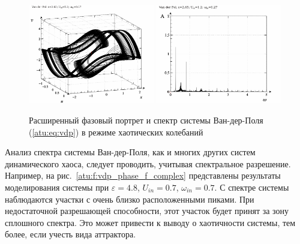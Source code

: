 \begin{figure}[ht!]
\begin{center}
  \includegraphics[width=0.49\textwidth]{p/cha/vdp/vdp_0-p_ph2d_2x65_1x20_0x27.png}
  \hfill
  \includegraphics[width=0.49\textwidth]{p/cha/vdp/vdp_fft-p_f_2x65_1x20_0x27.png}
\end{center}
  \caption{Расширенный фазовый портрет и спектр системы Ван-дер-Поля (\ref{atu:eq:vdp}) в режиме хаотических колебаний}
\label{atu:f:vdp_phase_f_chaos}
\end{figure}

Анализ спектра системы Ван-дер-Поля, как и многих других систем
динамического хаоса, следует проводить, учитывая
спектральное разрешение.
Например, на  рис.~\ref{atu:f:vdp_phase_f_complex}
представлены результаты моделирования системы при
$ \varepsilon=4.8$, $U_{in}=0.7$, $\omega_{in}=0.7$.
С спектре системы наблюдаются участки с очень близко
расположенными пиками. При недостаточной разрешающей способности,
этот участок будет принят за зону сплошного спектра.
Это может привести к выводу о хаотичности системы,
тем более, если учесть вида аттрактора.

